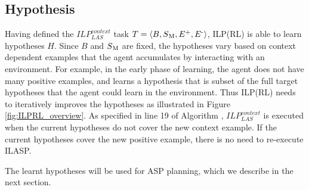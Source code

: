 \subsection{Hypothesis}
\label{sebsec:hypothesis}
Having defined the $ILP_{LAS}^{context}$ task $T = \langle B, S\textsubscript{M}, E\textsuperscript{+}, E\textsuperscript{-} \rangle$, ILP(RL) is able to learn hypotheses $H$. 
Since $B$ and $S\textsubscript{M}$ are fixed, the hypotheses vary based on context dependent examples that the agent accumulates by interacting with an environment.
For example, in the early phase of learning, the agent does not have many positive examples, and learns a hypothesis that is subset of the full target hypotheses that the agent could learn in the environment. Thus ILP(RL) needs to iteratively improves the hypotheses as illustrated in Figure \ref{fig:ILPRL_overview}.
As specified in line 19 of Algorithm \label{algo:ILPRL}, $ILP_{LAS}^{context}$ is executed when the current hypotheses do not cover the new context example.
If the current hypotheses cover the new positive example, there is no need to re-execute ILASP.

The learnt hypotheses will be used for ASP planning, which we describe in the next section.

